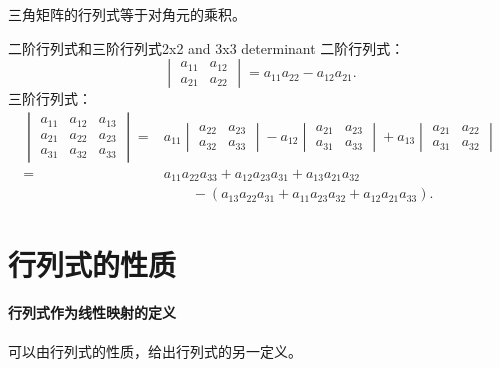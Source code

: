 \begin{corollary}
	三角矩阵的行列式等于对角元的乘积。
\end{corollary}

\begin{example}
	{二阶行列式和三阶行列式}{2x2 and 3x3 determinant}
	二阶行列式：
	\begin{equation}
			\begin{vmatrix}
				a_{11}&a_{12}\\a_{21}&a_{22}
			\end{vmatrix}=a_{11}a_{22}-a_{12}a_{21}.
	\end{equation}
	三阶行列式：
	\begin{equation}
		\begin{aligned}
			\begin{vmatrix}
				a_{11}&a_{12}&a_{13}\\
				a_{21}&a_{22}&a_{23}\\
				a_{31}&a_{32}&a_{33}
			\end{vmatrix}={}&a_{11}
			\begin{vmatrix}
				a_{22}&a_{23}\\
				a_{32}&a_{33}
			\end{vmatrix}-a_{12}
			\begin{vmatrix}
				a_{21}&a_{23}\\
				a_{31}&a_{33}
			\end{vmatrix}+a_{13}
			\begin{vmatrix}
				a_{21}&a_{22}\\
				a_{31}&a_{32}
			\end{vmatrix}\\
			={}&a_{11}a_{22}a_{33}+a_{12}a_{23}a_{31}+a_{13}a_{21}a_{32}\\
			&\qquad-(a_{13}a_{22}a_{31}+a_{11}a_{23}a_{32}+a_{12}a_{21}a_{33}).
		\end{aligned}
	\end{equation}
\end{example}

\section{行列式的性质}

\paragraph{行列式作为线性映射的定义}

可以由行列式的性质，给出行列式的另一定义。

